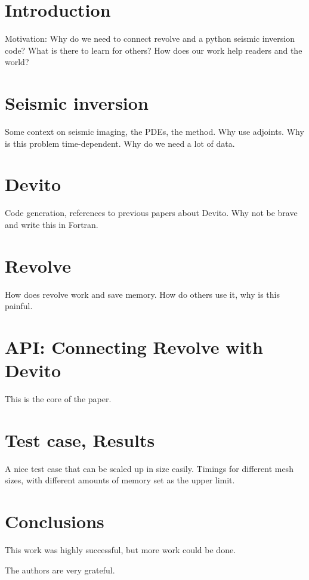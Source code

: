 \documentclass[sigconf]{acmart}
\begin{document}
\maketitle

\section{Introduction}
Motivation: Why do we need to connect revolve and a python seismic inversion code? What is there to learn for others? How does our work help readers and the world?

\section{Seismic inversion}
Some context on seismic imaging, the PDEs, the method. Why use adjoints. Why is this problem time-dependent. Why do we need a lot of data.

\section{Devito}
Code generation, references to previous papers about Devito. Why not be brave and write this in Fortran.

\section{Revolve}
How does revolve work and save memory. How do others use it, why is this painful.

\section{API: Connecting Revolve with Devito}
This is the core of the paper.

\section{Test case, Results}
A nice test case that can be scaled up in size easily. Timings for different mesh sizes, with different amounts of memory set as the upper limit.

\section{Conclusions}
This work was highly successful, but more work could be done.

\begin{acks}
  The authors are very grateful.
\end{acks}



 
\end{document}
